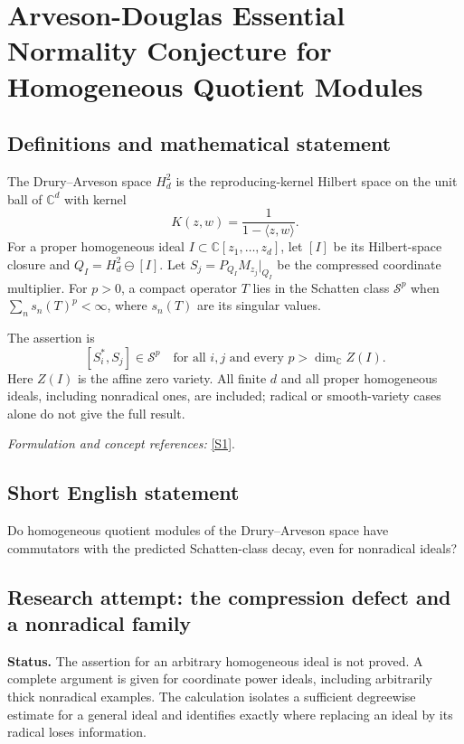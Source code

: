 \documentclass[11pt]{article}
\begin{document}
\section*{\texorpdfstring{Arveson-Douglas Essential Normality Conjecture for Homogeneous Quotient Modules}{Arveson-Douglas Essential Normality Conjecture for Homogeneous Quotient Modules}}\label{463}
\subsection{Definitions and mathematical statement}
The Drury--Arveson space $H_d^2$ is the reproducing-kernel Hilbert space on the unit ball of ${\mathbb{C}}^d$ with kernel
\[
 K(z,w)=\frac1{1-\langle z,w\rangle}.
\]
For a proper homogeneous ideal $I\subset{\mathbb{C}}[z_1,\ldots,z_d]$, let $[I]$ be its Hilbert-space closure and $Q_I=H_d^2\ominus[I]$. Let $S_j=P_{Q_I}M_{z_j}|_{Q_I}$ be the compressed coordinate multiplier. For $p>0$, a compact operator $T$ lies in the Schatten class $\mathcal S^p$ when $\sum_ns_n(T)^p<\infty$, where $s_n(T)$ are its singular values.

The assertion is
\[
 [S_i^*,S_j]\in\mathcal S^p
 \quad\text{for all }i,j\text{ and every }p>\dim_{{\mathbb{C}}} Z(I).
\]
Here $Z(I)$ is the affine zero variety. All finite $d$ and all proper homogeneous ideals, including nonradical ones, are included; radical or smooth-variety cases alone do not give the full result.
\par\smallskip\textit{Formulation and concept references:} \href{https://users.math.cas.cz/~englis/85.pdf}{[S1]}.

\subsection{Short English statement}
Do homogeneous quotient modules of the Drury--Arveson space have commutators with the predicted Schatten-class decay, even for nonradical ideals?
\subsection{Research attempt: the compression defect and a nonradical family}
\textbf{Status.} The assertion for an arbitrary homogeneous ideal is not proved. A complete argument is given for coordinate power ideals, including arbitrarily thick nonradical examples. The calculation isolates a sufficient degreewise estimate for a general ideal and identifies exactly where replacing an ideal by its radical loses information.
\end{document}
